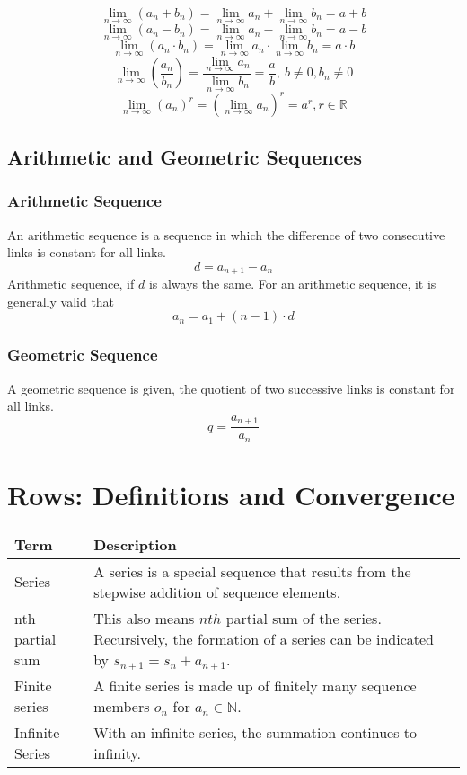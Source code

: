 \documentclass{book}
\begin{document}
\[
\lim\limits_{n\to \infty} (a_{n} + b_{n}) = \lim\limits_{n\to \infty} a_{n} + \lim\limits_{n\to \infty} b_{n} = a + b
\]
\[
\lim\limits_{n\to \infty} (a_{n} - b_{n}) = \lim\limits_{n\to \infty} a_{n} - \lim\limits_{n\to \infty} b_{n} = a - b
\]
\[
\lim\limits_{n\to \infty} (a_{n} \cdot b_{n}) = \lim\limits_{n\to \infty} a_{n} \cdot \lim\limits_{n\to \infty} b_{n} = a \cdot b
\]
\[
\lim\limits_{n\to \infty}(\frac{a_{n}}{b_{n}}) = \frac{\lim\limits_{n\to \infty} a_{n}}{\lim\limits_{n\to \infty} b_{n}} = \frac{a}{b}, \: b \ne 0, b_{n} \ne 0
\]
\[
\lim\limits_{n\to\infty} (a_{n})^{r} = \left(\lim\limits_{n\to\infty}a_{n}\right)^{r} = a^{r}, r \in \mathbb{R}
\]

\subsection{Arithmetic and Geometric Sequences}
\subsubsection{Arithmetic Sequence}
An arithmetic sequence is a sequence in which the difference of two consecutive links is constant for all links.
\[
  d = a_{n+1} - a_{n}
\]
Arithmetic sequence, if $d$ is always the same. For an arithmetic sequence, it is generally valid that
\[
  a_n = a_1 + (n-1)\cdot d
\]

\subsubsection{Geometric Sequence}
A geometric sequence is given, the quotient of two successive links is constant for all links.
\[
  q = \frac{a_{n+1}}{a_{n}}
\]


\section{Rows: Definitions and Convergence}

\begin{tabular}{p{3cm}p{10.5cm}}
  \toprule
  \textbf{Term} & \textbf{Description} \\
  \midrule
  Series    & A series is a special sequence that results from the stepwise addition of sequence elements.\\
  \midrule
  nth partial sum & This also means $nth$ partial sum of the series. Recursively, the formation of a series can be indicated by $s_{n+1} = s_{n} + a_{n+1}$.\\
  \midrule
  Finite series & A finite series is made up of finitely many sequence members $o_{n}$ for $a_{n}\in\mathbb{N}$.\\
  \midrule
  Infinite Series & With an infinite series, the summation continues to infinity.\\
  \bottomrule
\end{tabular}\\
\end{document}
